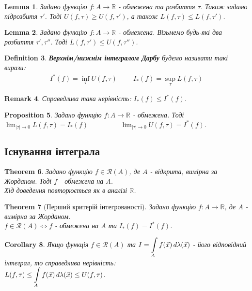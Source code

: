 \documentclass[a4paper, 10pt]{article}
\def\huge{\displaystyle}
\theoremstyle{theoremdd}
\newtheorem{theorem}{Theorem}[subsection]
\theoremstyle{theoremdd}
\newtheorem{definition}[theorem]{Definition}
\theoremstyle{theoremdd}
\theoremstyle{theoremdd}
\theoremstyle{theoremdd}
\newtheorem{proposition}[theorem]{Proposition}
\theoremstyle{theoremdd}
\newtheorem{remark}[theorem]{Remark}
\theoremstyle{theoremdd}
\newtheorem{lemma}[theorem]{Lemma}
\theoremstyle{theoremdd}
\newtheorem{corollary}[theorem]{Corollary}
\begin{document}
\begin{lemma}
Задано функцію $f: A \to \mathbb{R}$ - обмежена та розбиття $\tau$. Також задамо підрозбитя $\tau'$. Тоді $U(f,\tau) \geq U(f,\tau')$, а також  $L(f,\tau) \leq L(f,\tau')$.
\end{lemma}

\begin{lemma}
Задано функцію $f: A \to \mathbb{R}$ - обмежена. Візьмемо будь-які два розбиття $\tau', \tau''$. Тоді $L(f,\tau') \leq U(f,\tau'')$.
\end{lemma}

\begin{definition}
\textbf{Верхнім/нижнім інтегралом Дарбу} будемо називати такі вирази:
\begin{align*}
I^*(f) = \inf_\tau U(f, \tau) \hspace{1cm} I_*(f) = \sup_\tau L(f,\tau)
\end{align*}
\end{definition}

\begin{remark}
Справедлива така нерівність: $I_*(f) \leq I^*(f)$.
\end{remark}

\begin{proposition}
Задано функцію $f: A \to \mathbb{R}$ - обмежена. Тоді\\
$\huge\lim_{|\tau| \to 0} L(f,\tau) = I_*(f) \hspace{2cm} \lim_{|\tau| \to 0} U(f,\tau) = I^*(f)$.
\end{proposition}

\subsection{Існування інтеграла}
\begin{theorem}
Задано функцію $f \in \mathcal{R}(A)$, де $A$ - відкрита, вимірна за Жорданом. Тоді $f$ - обмежена на $A$.\\
\textit{Хід доведення повторюється як в аналізі $\mathbb{R}$.}
\end{theorem}

\begin{theorem}[Перший критерій інтегрованості]
Задано функцію $f: A \to \mathbb{R}$, де $A$ - вимірна за Жорданом.\\
$f \in \mathcal{R}(A) \iff f$ - обмежена на $A$ та $I_*(f) = I^*(f)$.
\end{theorem}

\begin{corollary}
Якщо функція $f \in \mathcal{R}(A)$ та $I = \huge\int\displaylimits_A f(\vec{x})\,d\lambda(\vec{x})$ - його відповідний інтеграл, то справедлива нерівність:\\
$L(f,\tau) \leq \huge\int\displaylimits_A f(\vec{x})\,d\lambda(\vec{x}) \leq U(f, \tau)$.
\end{corollary}
\end{document}
